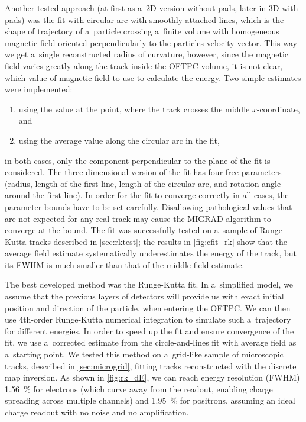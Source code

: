 		Another tested approach (at first as a~2D version without pads, later in 3D with pads) was the fit with circular arc with smoothly attached lines, which is the shape of trajectory of a~particle crossing a~finite volume with homogeneous magnetic field oriented perpendicularly to the particles velocity vector. This way we get a~single reconstructed radius of curvature, however, since the magnetic field varies greatly along the track inside the \ac{OFTPC} volume, it is not clear, which value of magnetic field to use to calculate the energy. Two simple estimates were implemented:
		\begin{enumerate}[nosep]
			\item using the value at the point, where the track crosses the middle $x$\nobreakdash-coordinate, and
			\item using the average value along the circular arc in the fit,
		\end{enumerate}
		in both cases, only the component perpendicular to the plane of the fit is considered. The three dimensional version of the fit has four free parameters (radius, length of the first line, length of the circular arc, and rotation angle around the first line). In order for the fit to converge correctly in all cases, the parameter bounds have to be set carefully. Disallowing pathological values that are not expected for any real track may cause the MIGRAD algorithm to converge at the bound. The fit was successfully tested on a~sample of Runge-Kutta tracks described in \cref{sec:rktest}; the results in \cref{fig:cfit_rk} show that the average field estimate systematically underestimates the energy of the track, but its \acs{FWHM} is much smaller than that of the middle field estimate.
		
		The best developed method was the Runge-Kutta fit. In a~simplified model, we assume that the previous layers of detectors will provide us with exact initial position and direction of the particle, when entering the \ac{OFTPC}. We can then use 4th\nobreakdash-order Runge-Kutta numerical integration to simulate such a~trajectory for different energies. In order to speed up the fit and ensure convergence of the fit, we use a~corrected estimate from the circle-and-lines fit with average field as a~starting point. We tested this method on a~grid-like sample of microscopic tracks, described in \cref{sec:microgrid}, fitting tracks reconstructed with the discrete map inversion. As shown in \cref{fig:rk_dE}, we can reach energy resolution (\acs{FWHM}) \qty{1.56}{\percent} for electrons (which curve away from the readout, enabling charge spreading across multiple channels) and \qty{1.95}{\percent} for positrons, assuming an ideal charge readout with no noise and no amplification.
	
